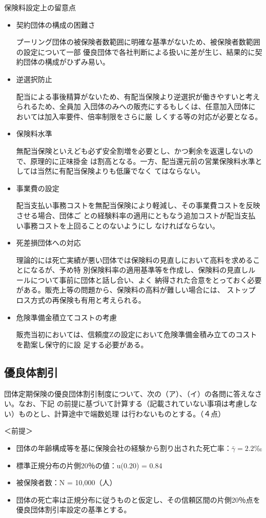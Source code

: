 \documentclass[report,gutter=10mm,fore-edge=10mm,uplatex,dvipdfmx]{jlreq}
\begin{document}
\begin{itemize}
\begin{itemize}
\end{itemize}
 保険料設定上の留意点
\begin{itemize}
\item[]契約団体の構成の困難さ\par
 プーリング団体の被保険者数範囲に明確な基準がないため、被保険者数範囲の設定について一部
 優良団体で各社判断による扱いに差が生じ、結果的に契約団体の構成がひずみ易い。
\item[]逆選択防止\par
 配当による事後精算がないため、有配当保険より逆選択が働きやすいと考えられるため、全員加
 入団体のみへの販売にするもしくは、任意加入団体においては加入率要件、倍率制限をさらに厳
 しくする等の対応が必要となる。
\item[]保険料水準\par
 無配当保険といえども必ず安全割増を必要とし、かつ剰余を返還しないので、原理的に正味掛金
 は割高となる。一方、配当還元前の営業保険料水準としては当然に有配当保険よりも低廉でなく
 てはならない。
\item[]事業費の設定\par
 配当支払い事務コストを無配当保険により軽減し、その事業費コストを反映させる場合、団体ご
 との経験料率の適用にともなう追加コストが配当支払い事務コストを上回ることのないようにし
 なければならない。
\item[]死差損団体への対応\par
 理論的には死亡実績が悪い団体では保険料の見直しにおいて高料を求めることになるが、予め特
 別保険料率の適用基準等を作成し、保険料の見直しルールについて事前に団体と話し合い、よく
 納得された合意をとっておく必要がある。販売上等の問題から、保険料の高料が難しい場合には、
 ストップロス方式の再保険も有用と考えられる。
\item[]危険準備金積立てコストの考慮\par
 販売当初においては、信頼度Zの設定において危険準備金積み立てのコストを勘案し保守的に設
 足する必要がある。
\end{itemize}
\end{itemize}
\subsection{優良体割引}
団体定期保険の優良団体割引制度について、次の（ア）、（イ）の各問に答えなさい。なお、下記
の前提に基づいて計算する（記載されていない事項は考慮しない）ものとし、計算途中で端数処理
は行わないものとする。（４点）

＜前提＞

\begin{itemize}
\item[] 団体の年齢構成等を基に保険会社の経験から割り出された死亡率：$\bar{\gamma}= 2.2$‰
\item[] 標準正規分布の片側20％の値：u(0.20) = 0.84
\item[] 被保険者数：N = 10,000（人）
\item[] 団体の死亡率は正規分布に従うものと仮定し、その信頼区間の片側20％点を優良団体割引率設定の基準とする。
\end{itemize}
\end{document}
